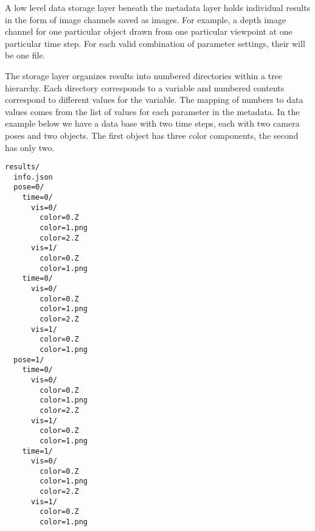 \label{sec:storage}

A low level data storage layer beneath the metadata layer holds individual results in the form of image channels saved as images. For example, a depth image channel for one particular object drawn from one particular viewpoint at one particular time step. For each valid combination of parameter settings, their will be one file.

The storage layer organizes results into numbered directories within a tree hierarchy. Each directory corresponds to a variable and numbered contents correspond to different values for the variable. The mapping of numbers to data values comes from the list of values for each parameter in the metadata. In the example below we have a data base with two time steps, each with two camera poses and two objects. The first object has three color components, the second has only two.

\begin{verbatim}
results/
  info.json
  pose=0/
    time=0/
      vis=0/
        color=0.Z
        color=1.png
        color=2.Z
      vis=1/
        color=0.Z
        color=1.png
    time=0/
      vis=0/
        color=0.Z
        color=1.png
        color=2.Z
      vis=1/
        color=0.Z
        color=1.png
  pose=1/
    time=0/
      vis=0/
        color=0.Z
        color=1.png
        color=2.Z
      vis=1/
        color=0.Z
        color=1.png
    time=1/
      vis=0/
        color=0.Z
        color=1.png
        color=2.Z
      vis=1/
        color=0.Z
        color=1.png
\end{verbatim}

\begin{comment}
The directory hierarchy follows an order that satisfies the constraints between variables. Applications that use the cinema python reference library should not worry about the specific layout of the results as they will be be isolated from version incompatibilities by the reference library. They can simply use the libraries MongoDB like database API to search for, insert and retrieve contents based on parameter names and values. For applications that can not use the reference API, the exact file structure mapping is described below.

This information is provided for those who wish to bypass the cinema\_python reference library but still use or create compatible file stores. In this situation it is necessary to know exactly how to map parameter value combinations to file names. There are three important aspects, one is to derive the file type and file format extension, another is to derive a specific file name for a particular value, and the last is to derive a consistent directory path given a collection of values.

Note that the exact format of the store has changed over time as Cinema has evolved. The reference library uses a cinema store's included version markers to provide backwards compatibility. We here describe the latest version information as of Cinema Chaplin version 0.1. For further details consult the FileStore class's \_get\_filename() method in the reference library.
\end{comment}

